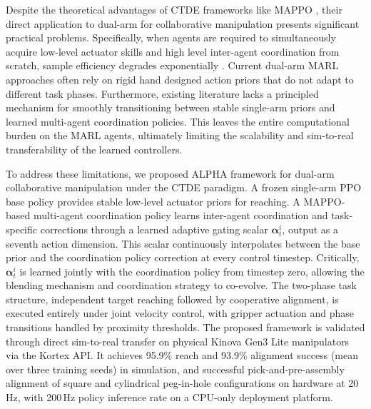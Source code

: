 \documentclass[a4paper,fleqn]{cas-dc}
\begin{document}
Despite the theoretical advantages of CTDE frameworks like MAPPO \cite{MAPPO}, their direct application to dual-arm for collaborative manipulation presents significant practical problems. Specifically, when agents are required to simultaneously acquire low-level actuator skills and high level inter-agent coordination from scratch, sample efficiency degrades exponentially \cite{intro-26, intro-27}. Current dual-arm MARL approaches often rely on rigid hand designed action priors that do not adapt to different task phases. Furthermore, existing literature lacks a principled mechanism for smoothly transitioning between stable single-arm priors and learned multi-agent coordination policies. This leaves the entire computational burden on the MARL agents, ultimately limiting the scalability and sim-to-real transferability of the learned controllers.

To address these limitations, we proposed ALPHA framework for dual-arm collaborative manipulation under the CTDE paradigm. A frozen single-arm PPO base policy provides stable low-level actuator priors for reaching. A MAPPO-based multi-agent coordination policy learns inter-agent coordination and task-specific corrections through a learned adaptive gating scalar $\mathbf{\alpha}^{i}_{t}$, output as a seventh action dimension. This scalar continuously interpolates between the base prior and the coordination policy correction at every control timestep. Critically, $\mathbf{\alpha}^{i}_{t}$ is learned jointly with the coordination policy from timestep zero, allowing the blending mechanism and coordination strategy to co-evolve. The two-phase task structure, independent target reaching followed by cooperative alignment, is executed entirely under joint velocity control, with gripper actuation and phase transitions handled by proximity thresholds. The proposed framework is validated through direct sim-to-real transfer on physical Kinova Gen3 Lite manipulators via the Kortex API. It achieves 95.9\% reach and 93.9\% alignment success (mean over three training seeds) in simulation, and successful pick-and-pre-assembly alignment of square and cylindrical peg-in-hole configurations on hardware at 20 Hz, with 200\,Hz policy inference rate on a CPU-only deployment platform.
\end{document}
